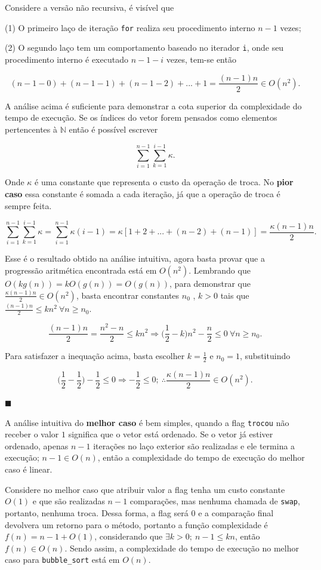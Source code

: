 Considere a versão não recursiva, é visível que 

(1) O primeiro laço de iteração \texttt{for} realiza seu procedimento interno $n-1$ vezes;

(2) O segundo laço tem um comportamento baseado no iterador \texttt{i}, onde seu procedimento interno é executado $n-1-i$ vezes, tem-se então

\[(n-1-0)+(n-1-1)+(n-1-2)+...+1 = \frac{(n-1)n}{2}\in O(n^2).\]

A análise acima é suficiente para demonstrar a cota superior da complexidade do tempo de execução. Se os índices do vetor forem pensados como elementos pertencentes à $\mathbb{N}$ então é possível escrever 

\[\sum_{i=1}^{n-1}\sum_{k=1}^{i-1}\kappa.\]

Onde $\kappa$ é uma constante que representa o custo da operação de troca. No \textbf{pior caso} essa constante é somada a cada iteração, já que a operação de troca é sempre feita.

\[\sum_{i=1}^{n-1}\sum_{k=1}^{i-1}\kappa = \sum_{i=1}^{n-1}\kappa(i-1) = \kappa[1+2+...+(n-2)+(n-1)]=\frac{\kappa(n-1)n}{2}.\]

Esse é o resultado obtido na análise intuitiva, agora basta provar que a progressão aritmética encontrada está em $O(n^2)$. Lembrando que $O(kg(n)) = kO(g(n)) = O(g(n))$, para demonstrar que $\frac{\kappa(n-1)n}{2} \in O(n^2)$, basta encontrar constantes $n_0$ , $k > 0$ tais que $\frac{(n-1)n}{2}\leq kn^2 \ \forall n\geq n_0$.

\[\frac{(n-1)n}{2}=\frac{n^2 - n}{2}\leq kn^2 \Rightarrow \Bigr(\frac{1}{2}-k\Bigr)n^2 - \frac{n}{2}\leq 0 \ \forall n\geq n_0.\]

Para satisfazer a inequação acima, basta escolher $k=\frac{1}{2}$ e $n_0=1$, substituindo

\[\Bigr(\frac{1}{2}-\frac{1}{2}\Bigr) - \frac{1}{2} \leq 0 \Rightarrow-\frac{1}{2} \leq 0; \ \therefore \frac{\kappa(n-1)n}{2}\in O(n^2).\]

{\raggedleft $\blacksquare $ \par}

A análise intuitiva do \textbf{melhor caso} é bem simples, quando a flag \texttt{trocou} não receber o valor $1$ significa que o vetor está ordenado. Se o vetor já estiver ordenado, apenas $n-1$ iterações no laço exterior são realizadas e ele termina a execução; $n-1 \in O(n)$, então a complexidade do tempo de execução do melhor caso é linear.

Considere no melhor caso que atribuir valor a flag tenha um custo constante $O(1)$ e que são realizadas $n-1$ comparações, mas nenhuma chamada de \texttt{swap}, portanto, nenhuma troca. Dessa forma, a flag será $0$ e a comparação final devolvera um retorno para o método, portanto a função complexidade é $f(n) = n-1+O(1)$, considerando que $\exists k > 0; \ n-1 \leq kn$, então $f(n) \in O(n)$. Sendo assim, a complexidade do tempo de execução no melhor caso para \texttt{bubble\_sort} está em $O(n)$.

